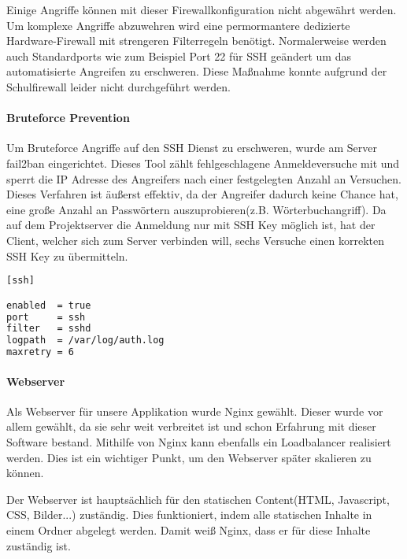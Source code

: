 Einige Angriffe können mit dieser Firewallkonfiguration nicht abgewährt werden. Um komplexe Angriffe abzuwehren wird eine permormantere dedizierte Hardware-Firewall mit strengeren Filterregeln benötigt. Normalerweise werden auch Standardports wie zum Beispiel Port 22 für SSH geändert um das automatisierte Angreifen zu erschweren. Diese Maßnahme konnte aufgrund der Schulfirewall leider nicht durchgeführt werden.

\paragraph{Bruteforce Prevention}
Um Bruteforce Angriffe auf den SSH Dienst zu erschweren, wurde am Server fail2ban eingerichtet. Dieses Tool zählt fehlgeschlagene Anmeldeversuche mit und sperrt die IP Adresse des Angreifers nach einer festgelegten Anzahl an Versuchen. Dieses Verfahren ist äußerst effektiv, da der Angreifer dadurch keine Chance hat, eine große Anzahl an Passwörtern auszuprobieren(z.B. Wörterbuchangriff). Da auf dem Projektserver die Anmeldung nur mit SSH Key möglich ist, hat der Client, welcher sich zum Server verbinden will, sechs Versuche einen korrekten SSH Key zu übermitteln. \cite{FAIL2BAN}

\begin{lstlisting}[caption = Auszug aus der fail2ban Konfiguration, label = fail2ban1, language=bash]
[ssh]

enabled  = true
port     = ssh
filter   = sshd
logpath  = /var/log/auth.log
maxretry = 6
\end{lstlisting}

\paragraph{Webserver}
\label{websrv}
Als Webserver für unsere Applikation wurde Nginx gewählt. Dieser wurde vor allem gewählt, da sie sehr weit verbreitet ist und schon Erfahrung mit dieser Software bestand. Mithilfe von Nginx kann ebenfalls ein Loadbalancer realisiert werden. Dies ist ein wichtiger Punkt, um den Webserver später skalieren zu können. \\


Der Webserver ist hauptsächlich für den statischen Content(HTML, Javascript, CSS, Bilder...) zuständig. Dies funktioniert, indem alle statischen Inhalte in einem Ordner abgelegt werden. Damit weiß Nginx, dass er für diese Inhalte zuständig ist.

